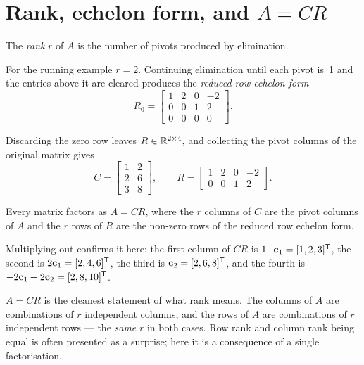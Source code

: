 
\section{Rank, echelon form, and \texorpdfstring{\(A=CR\)}{A=CR}}

\begin{definition}
The \emph{rank} \(r\) of \(A\) is the number of pivots produced by elimination.
\end{definition}

For the running example \(r=2\). Continuing elimination until each pivot is~1
and the entries above it are cleared produces the \emph{reduced row echelon
form}
\[
	R_0=\begin{bmatrix}1&2&0&-2\\0&0&1&2\\0&0&0&0\end{bmatrix}.
\]

Discarding the zero row leaves \(R\in\mathbb{R}^{2\times4}\), and collecting the pivot
columns of the original matrix gives
\[
	C=\begin{bmatrix}1&2\\2&6\\3&8\end{bmatrix},
	\qquad
	R=\begin{bmatrix}1&2&0&-2\\0&0&1&2\end{bmatrix}.
\]

\begin{theorem}
Every matrix factors as \(A=CR\), where the \(r\) columns of \(C\) are the pivot
columns of \(A\) and the \(r\) rows of \(R\) are the non-zero rows of the reduced
row echelon form.
\end{theorem}

Multiplying out confirms it here: the first column of \(CR\) is
\(1\cdot\mathbf{c}_1=[1,2,3]^{\mathsf{T}}\), the second is \(2\mathbf{c}_1=[2,4,6]^{\mathsf{T}}\), the
third is \(\mathbf{c}_2=[2,6,8]^{\mathsf{T}}\), and the fourth is
\(-2\mathbf{c}_1+2\mathbf{c}_2=[2,8,10]^{\mathsf{T}}\).

\begin{remark}
\(A=CR\) is the cleanest statement of what rank means. The columns of \(A\) are
combinations of \(r\) independent columns, and the rows of \(A\) are
combinations of \(r\) independent rows --- the \emph{same} \(r\) in both cases.
Row rank and column rank being equal is often presented as a surprise; here it
is a consequence of a single factorisation.
\end{remark}

